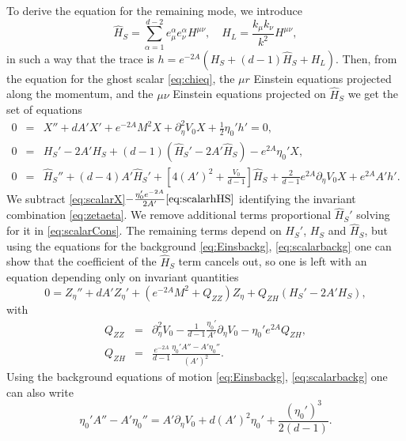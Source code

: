 To derive the equation for the remaining mode, we introduce
\begin{equation}
	\widehat H_S=\sum_{\alpha=1}^{d-2}e_\mu^\alpha e_\nu^\alpha H^{\mu\nu}, \quad H_L=\frac{k_\mu k_\nu}{k^2}H^{\mu\nu},
\end{equation}
in such a way that the trace is $h=e^{-2A}(H_S+(d-1)\widehat H_S+H_L)$. Then, from the equation for the ghost scalar \eqref{eq:chieq}, the $\mu r$ Einstein equations projected along the momentum, and the $\mu\nu$ Einstein equations projected on $\widehat H_S$ we get the set of equations
\begin{eqnarray}
\label{eq:scalarX} 0&=& X''+dA'X'+e^{-2A}M^2 X+\partial_\eta^2 V_0 X+\frac{1}{2}\eta_0' h'=0,\\
\label{eq:scalarCons} 0&=& H_S'-2A' H_S+(d-1)(\widehat H_S'-2A' \widehat H_S)-e^{2A}\eta_0' X,\\
\label{eq:scalarhHS} 0&=& \widehat H_S''+(d-4) A' \widehat H_S'+\left[4(A')^2+\frac{V_0}{d-1}\right]\widehat H_S+\frac{2}{d-1}e^{2A}\partial_\eta V_0 X+e^{2A}A' h'.
\end{eqnarray}
We subtract \eqref{eq:scalarX}$-\frac{\eta_0'e^{-2A}}{2A'}\eqref{eq:scalarhHS}$ identifying the invariant combination \eqref{eq:zetaeta}. We remove additional terms proportional $\widehat H_S'$ solving for it in \eqref{eq:scalarCons}. The remaining terms depend on $H_S'$, $H_S$ and $\widehat H_S$, but using the equations for the background \eqref{eq:Einsbackg}, \eqref{eq:scalarbackg} one can show that the coefficient of the $\widehat H_S$ term cancels out, so one is left with an equation depending only on invariant quantities
\begin{equation}\label{eq:invariantZeq}
	0=Z_\eta''+dA' Z_\eta'+\left(e^{-2A}M^2+Q_{ZZ}\right)Z_\eta+Q_{ZH}(H_S'-2A' H_S),
\end{equation}
with
\begin{eqnarray}\label{eq:Qcoefs}
	Q_{ZZ}&=& \partial_\eta^2V_0-\frac{1}{d-1}\frac{\eta_0'}{A'}\partial_\eta V_0-\eta_0' e^{2A} Q_{ZH},\\
	Q_{ZH} &=& \frac{e^{-2A}}{d-1}\frac{\eta_0'A''-A'\eta_0''}{(A')^2}.
\end{eqnarray}
Using the background equations of motion \eqref{eq:Einsbackg}, \eqref{eq:scalarbackg} one can also write
\begin{equation}\label{eq:Qcoef2}
	\eta_0'A''-A'\eta_0''=A'\partial_\eta V_0+d(A')^2\eta_0'+\frac{(\eta_0')^3}{2(d-1)}.
\end{equation}

